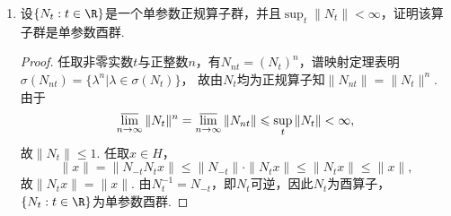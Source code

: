 \begin{enumerate}
\item[7]
设$\{N_t:t\in\R\}$是一个单参数正规算子群，并且$\sup_t\|N_t\|<\infty$，证明该算子群是单参数酉群.
\begin{proof}
    任取非零实数$t$与正整数$n$，有$N_{nt}=(N_t)^n$，谱映射定理表明$\sigma(N_{nt})=\{\lambda^n|\lambda\in\sigma(N_t)\}$，
    故由$N_t$均为正规算子知$\|N_{nt}\|=\|N_t\|^n$.
    由于\[\varlimsup_{n\to\infty}\|N_t\|^n=\varlimsup_{n\to\infty}\|N_{nt}\|\leqslant\sup_t\|N_t\|<\infty,\]
    故$\|N_t\|\leqslant1$. 任取$x\in H$，
    \[\|x\|=\|N_{-t}N_t x\|\leqslant\|N_{-t}\|\cdot\|N_t x\|\leqslant\|N_t x\|\leqslant\|x\|,\]
    故$\|N_t x\|=\|x\|$. 由$N_t^{-1}=N_{-t}$，即$N_t$可逆，因此$N_t$为酉算子，$\{N_t:t\in\R\}$为单参数酉群.
\end{proof}

\end{enumerate}

